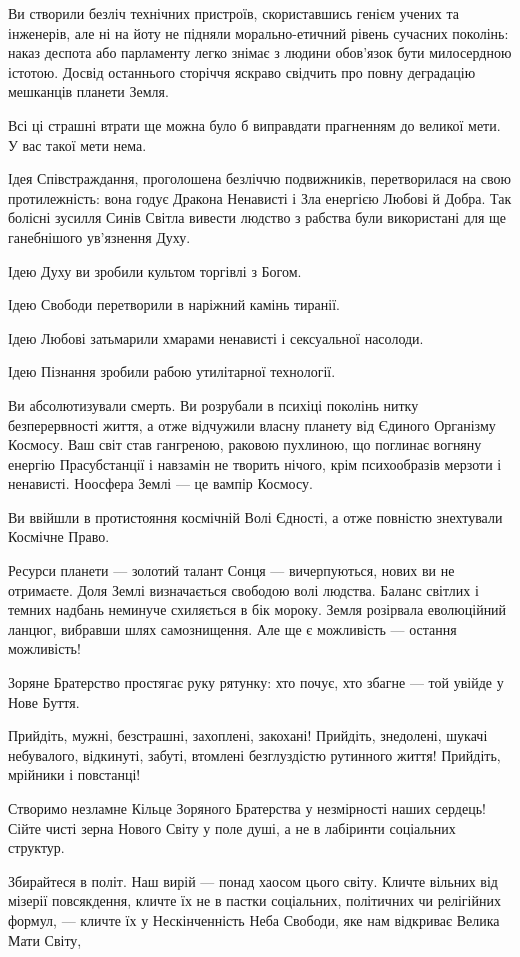 Ви створили безліч технічних пристроїв, скориставшись генієм учених та
інженерів, але ні на йоту не підняли морально-етичний рівень сучасних поколінь:
наказ деспота або парламенту легко знімає з людини обов’язок бути милосердною
істотою. Досвід останнього сторіччя яскраво свідчить про повну деградацію
мешканців планети Земля.

Всі ці страшні втрати ще можна було б виправдати прагненням до великої мети. У
вас такої мети нема.

Ідея Співстраждання, проголошена безліччю подвижників, перетворилася на свою
протилежність: вона годує Дракона Ненависті і Зла енергією Любові й Добра. Так
болісні зусилля Синів Світла вивести людство з рабства були використані для ще
ганебнішого ув’язнення Духу.

Ідею Духу ви зробили культом торгівлі з Богом.

Ідею Свободи перетворили в наріжний камінь тиранії.

Ідею Любові затьмарили хмарами ненависті і сексуальної насолоди.

Ідею Пізнання зробили рабою утилітарної технології.

Ви абсолютизували смерть. Ви розрубали в психіці поколінь нитку безперервності
життя, а отже відчужили власну планету від Єдиного Організму Космосу. Ваш світ
став гангреною, раковою пухлиною, що поглинає вогняну енергію Прасубстанції і
навзамін не творить нічого, крім психообразів мерзоти і ненависті. Ноосфера
Землі — це вампір Космосу.

Ви ввійшли в протистояння космічній Волі Єдності, а отже повністю знехтували
Космічне Право.

Ресурси планети — золотий талант Сонця — вичерпуються, нових ви не отримаєте.
Доля Землі визначається свободою волі людства. Баланс світлих і темних надбань
неминуче схиляється в бік мороку. Земля розірвала еволюційний ланцюг, вибравши
шлях самознищення. Але ще є можливість — остання можливість!

Зоряне Братерство простягає руку рятунку: хто почує, хто збагне — той увійде у
Нове Буття.

Прийдіть, мужні, безстрашні, захоплені, закохані! Прийдіть, знедолені, шукачі
небувалого, відкинуті, забуті, втомлені безглуздістю рутинного життя! Прийдіть,
мрійники і повстанці!

Створимо незламне Кільце Зоряного Братерства у незмірності наших сердець! Сійте
чисті зерна Нового Світу у поле душі, а не в лабіринти соціальних структур.

Збирайтеся в політ. Наш вирій — понад хаосом цього світу. Кличте вільних від
мізерії повсякдення, кличте їх не в пастки соціальних, політичних чи релігійних
формул, — кличте їх у Нескінченність Неба Свободи, яке нам відкриває Велика
Мати Світу,


